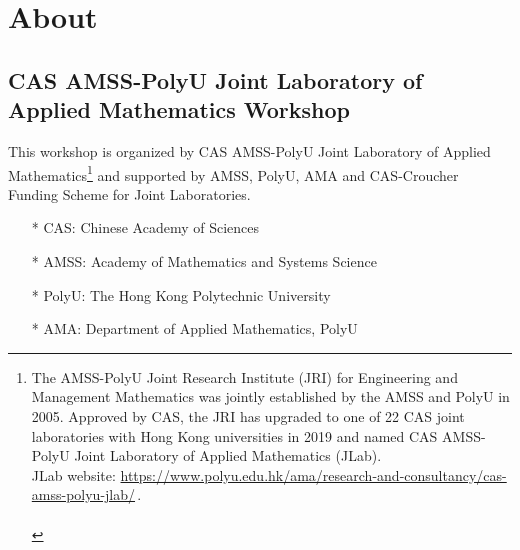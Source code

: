 \documentclass[
	openany, %
	parskip=full, %
	12pt, %
	a4paper, %
]{conferencebooklet} %
\begin{document}



\tableofcontents


\chapter{About}



\section{CAS AMSS-PolyU Joint Laboratory of Applied Mathematics Workshop}

This workshop is organized by CAS AMSS-PolyU  Joint Laboratory of Applied Mathematics\footnote{The AMSS-PolyU Joint Research Institute (JRI) for Engineering and Management Mathematics was jointly established by the AMSS and PolyU in 2005. Approved by CAS, the JRI has upgraded to one of 22 CAS joint laboratories with Hong Kong universities in 2019 and named CAS AMSS-PolyU Joint Laboratory of Applied Mathematics (JLab).\\
JLab website: \url{https://www.polyu.edu.hk/ama/research-and-consultancy/cas-amss-polyu-jlab/}\,.\\ \\ } and supported by AMSS, PolyU, AMA and CAS-Croucher Funding Scheme for Joint Laboratories.



\begin{center}
	\begin{itemize}
	    \item[*] CAS: Chinese Academy of Sciences
	    \item[*] AMSS: Academy of Mathematics and Systems Science
	    \item[*] PolyU: The Hong Kong Polytechnic University
	    \item[*] AMA: Department of Applied Mathematics, PolyU
	\end{itemize}
\end{center}
\end{document}
